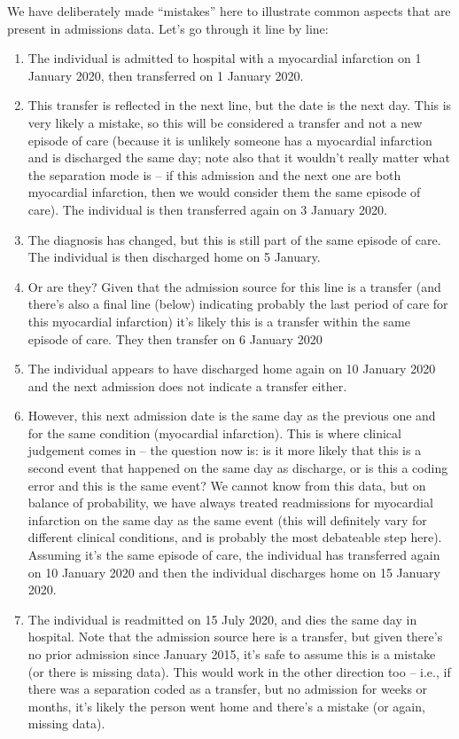 \documentclass[11pt]{article}
\begin{document}
\color{Blue4}
\begin{stlog}\end{stlog}
\color{black}

We have deliberately made ``mistakes'' here to illustrate
common aspects that are present in admissions data. Let's go through it line by line:
\begin{enumerate}
\item The individual is admitted to hospital with a myocardial infarction on 1 January 2020, 
then transferred on 1 January 2020.
\item This transfer is reflected in the next line, but the date is the next day. This is very likely
a mistake, so this will be considered a transfer and not a new episode of care (because it is unlikely
someone has a myocardial infarction and is discharged the same day; note also that it wouldn't really
matter what the separation mode is -- if this admission and the next one are both myocardial infarction,
then we would consider them the same episode of care). The individual is then transferred again on 
3 January 2020.
\item The diagnosis has changed, but this is still part of the same episode of care. 
The individual is then discharged home on 5 January.
\item Or are they? Given that the admission source for this line is a transfer
(and there's also a final line (below) indicating probably the last period of care for this
myocardial infarction) it's likely this is a transfer within the same episode of care. They then
transfer on 6 January 2020
\item The individual appears to have discharged home again on 10 January 2020 and 
the next admission does not indicate a transfer either.
\item However, this next admission date is the same day as the previous one and for the same
condition (myocardial infarction). This is where clinical judgement comes in -- the question now
is: is it more likely that this is a second event that happened on the same day as discharge, or
is this a coding error and this is the same event? We cannot know from this data, but on balance of 
probability, we have always treated readmissions for myocardial infarction on the same day
as the same event (this will definitely vary for different clinical conditions, and is probably
the most debateable step here). Assuming it's the same episode of care, the individual has transferred again
on 10 January 2020 and then the individual discharges home on 15 January 2020.
\item The individual is readmitted on 15 July 2020, and dies the same day in hospital. Note that
the admission source here is a transfer, but given there's no prior admission since January 2015, 
it's safe to assume this is a mistake (or there is missing data). This would work in the other direction too --
i.e., if there was a separation coded as a transfer, but no admission for weeks or months, it's likely the person
went home and there's a mistake (or again, missing data). 
\end{enumerate}
\end{document}
